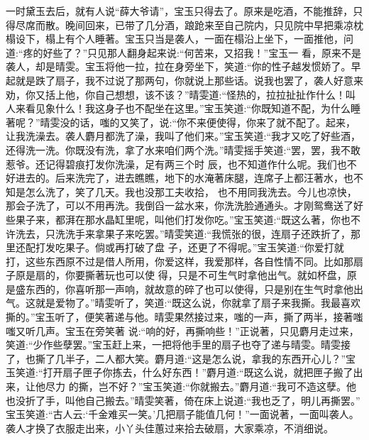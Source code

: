 \begin{parag}
    一时黛玉去后，就有人说“薛大爷请”，宝玉只得去了。原来是吃酒，不能推辞，只得尽席而散。晚间回来，已带了几分酒，踉跄来至自己院内，只见院中早把乘凉枕榻设下，榻上有个人睡著。宝玉只当是袭人，一面在榻沿上坐下，一面推他，问道:“疼的好些了？”只见那人翻身起来说:“何苦来，又招我！”宝玉一 看，原来不是袭人，却是晴雯。宝玉将他一拉，拉在身旁坐下，笑道:“你的性子越发惯娇了。早起就是跌了扇子，我不过说了那两句，你就说上那些话。说我也罢了，袭人好意来劝，你又括上他，你自己想想，该不该？”晴雯道:“怪热的，拉拉扯扯作什么！叫人来看见象什么！我这身子也不配坐在这里。”宝玉笑道:“你既知道不配，为什么睡著呢？”晴雯没的话，嗤的又笑了，说:“你不来便使得，你来了就不配了。起来，让我洗澡去。袭人麝月都洗了澡，我叫了他们来。”宝玉笑道:“我才又吃了好些酒，还得洗一洗。你既没有洗，拿了水来咱们两个洗。”晴雯摇手笑道:“罢，罢，我不敢惹爷。还记得碧痕打发你洗澡，足有两三个时 辰，也不知道作什么呢。我们也不好进去的。后来洗完了，进去瞧瞧，地下的水淹著床腿，连席子上都汪著水，也不知是怎么洗了，笑了几天。我也没那工夫收拾， 也不用同我洗去。今儿也凉快，那会子洗了，可以不用再洗。我倒舀一盆水来，你洗洗脸通通头。才刚鸳鸯送了好些果子来，都湃在那水晶缸里呢，叫他们打发你吃。”宝玉笑道:“既这么著，你也不许洗去，只洗洗手来拿果子来吃罢。”晴雯笑道:“我慌张的很，连扇子还跌折了，那里还配打发吃果子。倘或再打破了盘 子，还更了不得呢。”宝玉笑道:“你爱打就打，这些东西原不过是借人所用，你爱这样，我爱那样，各自性情不同。比如那扇子原是扇的，你要撕著玩也可以使 得，只是不可生气时拿他出气。就如杯盘，原是盛东西的，你喜听那一声响，就故意的碎了也可以使得，只是别在生气时拿他出气。这就是爱物了。”晴雯听了，笑道:“既这么说，你就拿了扇子来我撕。我最喜欢撕的。”宝玉听了，便笑著递与他。晴雯果然接过来，嗤的一声，撕了两半，接著嗤嗤又听几声。宝玉在旁笑著 说:“响的好，再撕响些！”正说著，只见麝月走过来，笑道:“少作些孽罢。”宝玉赶上来，一把将他手里的扇子也夺了递与晴雯。晴雯接了，也撕了几半子，二人都大笑。麝月道:“这是怎么说，拿我的东西开心儿？”宝玉笑道:“打开扇子匣子你拣去，什么好东西！”麝月道:“既这么说，就把匣子搬了出来，让他尽力 的撕，岂不好？”宝玉笑道:“你就搬去。”麝月道:“我可不造这孽。他也没折了手，叫他自己搬去。”晴雯笑著，倚在床上说道:“我也乏了，明儿再撕罢。” 宝玉笑道:“古人云:‘千金难买一笑。’几把扇子能值几何！”一面说著，一面叫袭人。袭人才换了衣服走出来，小丫头佳蕙过来拾去破扇，大家乘凉，不消细说。
\end{parag}


